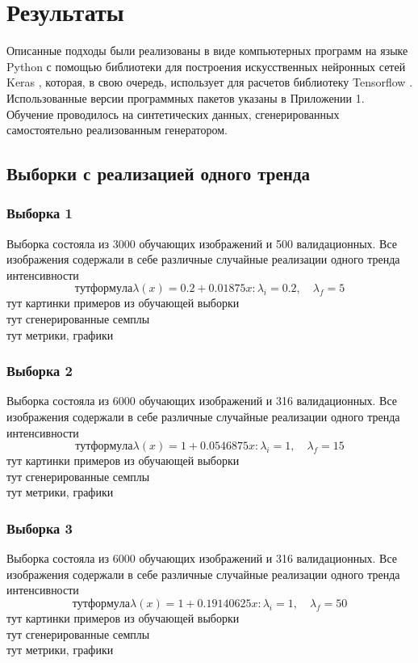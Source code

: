 \section{Результаты}
	Описанные подходы были реализованы в виде компьютерных программ на языке Python с помощью библиотеки для построения искусственных нейронных сетей Keras \cite{keras}, которая, в свою очередь, использует для расчетов библиотеку Tensorflow \cite{tf}. Использованные версии программных пакетов указаны в Приложении 1. Обучение проводилось на синтетических данных, сгенерированных самостоятельно реализованным генератором. 
	\subsection{Выборки с реализацией одного тренда}
		\subsubsection{Выборка 1}
			Выборка состояла из 3000 обучающих изображений и 500 валидационных. Все изображения содержали в себе различные случайные реализации одного тренда интенсивности
			$$тут формула \lambda(x) = 0.2 + 0.01875x : \lambda_i = 0.2, \quad \lambda_f = 5$$
			тут картинки примеров из обучающей выборки \\
			тут сгенерированные семплы \\
			тут метрики, графики
		\subsubsection{Выборка 2}
			Выборка состояла из 6000 обучающих изображений и 316 валидационных. Все изображения содержали в себе различные случайные реализации одного тренда интенсивности
			$$тут формула \lambda(x) = 1 + 0.0546875x: \lambda_i = 1, \quad \lambda_f = 15$$
			тут картинки примеров из обучающей выборки \\
			тут сгенерированные семплы \\
			тут метрики, графики
		\subsubsection{Выборка 3}
			Выборка состояла из 6000 обучающих изображений и 316 валидационных. Все изображения содержали в себе различные случайные реализации одного тренда интенсивности
			$$тут формула \lambda(x) = 1 + 0.19140625x: \lambda_i = 1, \quad \lambda_f = 50$$
			тут картинки примеров из обучающей выборки \\
			тут сгенерированные семплы \\
			тут метрики, графики
		
